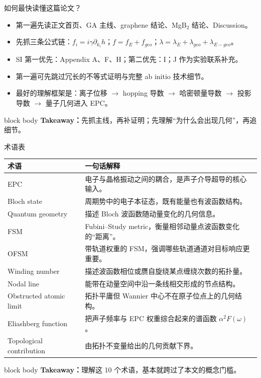 \documentclass[aspectratio=169,11pt,UTF8]{ctexbeamer}
\newcommand{\takeaway}[1]{%
  \vfill
  \begin{beamercolorbox}[wd=\textwidth,sep=0.7ex,rounded=true]{block body}
    \small\textbf{Takeaway：}#1
  \end{beamercolorbox}
}
\begin{document}
\begin{frame}{如何最快读懂这篇论文？}
  \begin{itemize}
    \item 第一遍先读正文首页、GA 主线、graphene 结论、MgB$_2$ 结论、Discussion。
    \item 先抓三条公式链：$f_i=i\gamma \partial_{k_i}h$；$f=f_E+f_{geo}$；$\lambda=\lambda_E+\lambda_{geo}+\lambda_{E-geo}$。
    \item SI 第一优先：Appendix A、F、H；第二优先：I；J 作为实验联系补充。
    \item 第一遍可先跳过冗长的不等式证明与完整 ab initio 技术细节。
    \item 最好的理解框架是：\alert{离子位移 $\rightarrow$ hopping 导数 $\rightarrow$ 哈密顿量导数 $\rightarrow$ 投影导数 $\rightarrow$ 量子几何进入 EPC。}
  \end{itemize}
  \takeaway{先抓主线，再补证明；先理解“为什么会出现几何”，再追细节。}
\end{frame}

\begin{frame}{术语表}
  \small
  \begin{tabular}{>{\raggedright\arraybackslash}p{} >{\raggedright\arraybackslash}p{}}
    \toprule
    术语 & 一句话解释 \\
    \midrule
    EPC & 电子与晶格振动之间的耦合，是声子介导超导的核心输入。 \\
    Bloch state & 周期势中的电子本征态，既有能量也有波函数结构。 \\
    Quantum geometry & 描述 Bloch 波函数随动量变化的几何信息。 \\
    FSM & Fubini--Study metric，衡量相邻动量点波函数变化的“距离”。 \\
    OFSM & 带轨道权重的 FSM，强调哪些轨道通道对目标响应更重要。 \\
    Winding number & 描述波函数相位或赝自旋绕某点缠绕次数的拓扑量。 \\
    Nodal line & 能带在动量空间中沿一条线相交形成的节点结构。 \\
    Obstructed atomic limit & 拓扑平庸但 Wannier 中心不在原子位点上的几何结构。 \\
    Eliashberg function & 把声子频率与 EPC 权重综合起来的谱函数 $\alpha^2F(\omega)$。 \\
    Topological contribution & 由拓扑不变量给出的几何贡献下界。 \\
    \bottomrule
  \end{tabular}
  \takeaway{理解这 10 个术语，基本就跨过了本文的概念门槛。}
\end{frame}
\end{document}
